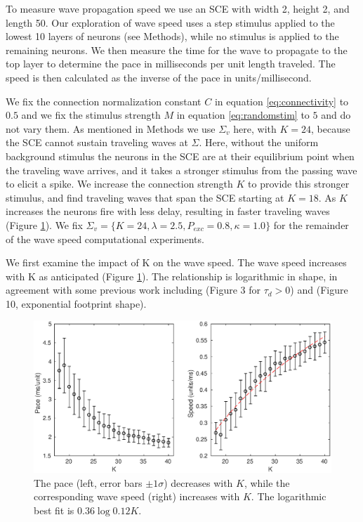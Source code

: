 \FloatBarrier

To measure wave propagation speed we use an SCE with width 2, height 2, and length 50.
Our exploration of wave speed uses a step stimulus applied to the lowest 10 layers of neurons (see Methods), while no stimulus is applied to the remaining neurons.
We then measure the time for the wave to propagate to the top layer to determine the pace in milliseconds per unit length traveled.
The speed is then calculated as the inverse of the pace in units/millisecond.

We fix the connection normalization constant $C$ in equation \ref{eq:connectivity} to $0.5$ and we fix the stimulus strength $M$ in equation \ref{eq:randomstim} to $5$ and do not vary them.
As mentioned in Methods we use $\Sigma_v$ here, with $K=24$, because the SCE cannot sustain traveling waves at $\Sigma$. 
Here, without the uniform background stimulus the neurons in the SCE are at their equilibrium point when the traveling wave arrives, and it takes a stronger stimulus from the passing wave to elicit a spike.
We increase the connection strength $K$ to provide this stronger stimulus, and find traveling waves that span the SCE starting at $K=18$. 
As $K$ increases the neurons fire with less delay, resulting in faster traveling waves (Figure \ref{fig:delay_k}).
We fix $\Sigma_v = \{K=24,\lambda=2.5,P_{exc}=0.8,\kappa=1.0 \}$ for the remainder of the wave speed computational experiments.

We first examine the impact of K on the wave speed.
The wave speed increases with K as anticipated (Figure \ref{fig:delay_k}).
The relationship is logarithmic in shape, in agreement with some previous work including \citet{Golomb1999} (Figure 3 for $\tau_d>0$) and \citet{Golomb1996}(Figure 10, exponential footprint shape).
\begin{figure}[!htb]
 \centering
   \includegraphics[width=\textwidth]{fig/WaveSpeed_K}
   \caption{The pace (left, error bars $\pm 1 \sigma$) decreases with $K$, while the corresponding wave speed (right) increases with $K$. 
          The logarithmic best fit is $0.36\log{0.12K}$.}
   \label{fig:delay_k}
\end{figure}

